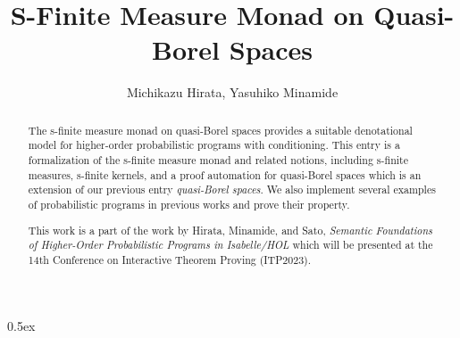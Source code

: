 \documentclass[11pt,a4paper]{article}
\begin{document}
\title{S-Finite Measure Monad on Quasi-Borel Spaces}
\author{Michikazu Hirata, Yasuhiko Minamide}
\maketitle
\begin{abstract}
  The s-finite measure monad on quasi-Borel spaces provides
  a suitable denotational model for higher-order probabilistic programs
  with conditioning.
  This entry is a formalization of the s-finite measure monad and related notions,
  including s-finite measures, s-finite kernels, and a proof automation for quasi-Borel spaces which is an
  extension of our previous entry \textit{quasi-Borel spaces}.
  We also implement several examples of probabilistic programs in previous works and prove their property.

  This work is a part of the work by Hirata, Minamide, and Sato,
  \textit{Semantic Foundations of Higher-Order Probabilistic Programs in Isabelle/HOL}
   which will be presented at the 14th Conference on Interactive Theorem Proving (ITP2023).
\end{abstract}

\tableofcontents

\parindent 0pt\parskip 0.5ex





\end{document}
